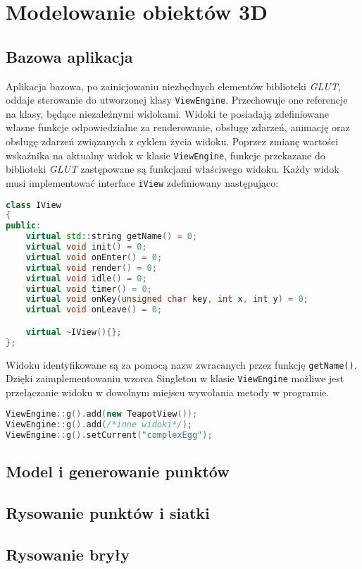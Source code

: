 \newpage
\section{Modelowanie obiektów 3D}
\subsection{Bazowa aplikacja}
Aplikacja bazowa, po zainicjowaniu niezbędnych elementów biblioteki \textit{GLUT}, oddaje sterowanie do utworzonej klasy \lstinline{ViewEngine}. Przechowuje one referencje na klasy, będące niezależnymi widokami. Widoki te posiadają zdefiniowane własne funkcje odpowiedzialne za renderowanie, obsługę zdarzeń, animację oraz obsługę zdarzeń związanych z cyklem życia widoku. Poprzez zmianę wartości wskaźnika na aktualny widok w klasie \lstinline{ViewEngine}, funkcje przekazane do biblioteki \textit{GLUT} zastępowane są funkcjami właściwego widoku. Każdy widok musi implementować interface \lstinline{iView} zdefiniowany następująco:

\begin{lstlisting}[language=C++, caption=Interface IView.]
class IView
{
public:
    virtual std::string getName() = 0;
    virtual void init() = 0;
    virtual void onEnter() = 0;
    virtual void render() = 0;
    virtual void idle() = 0;
    virtual void timer() = 0;
    virtual void onKey(unsigned char key, int x, int y) = 0;
    virtual void onLeave() = 0;

    virtual ~IView(){};
};
\end{lstlisting}
Widoku identyfikowane są za pomocą nazw zwracanych przez funkcję \lstinline{getName()}.
Dzięki zaimplementowaniu wzorca Singleton w klasie \lstinline{ViewEngine} możliwe jest przełączanie widoku w dowolnym miejscu wywołania metody w programie.
\begin{lstlisting}[language=C++, caption=Tworzeznie instancji widoków i ustawianie obecnego. Funkcja \lstinline{g} zwraca instancję klasy.]
ViewEngine::g().add(new TeapotView());
ViewEngine::g().add(/*inne widoki*/);
ViewEngine::g().setCurrent("complexEgg");
\end{lstlisting}
\subsection{Model i generowanie punktów}

\subsection{Rysowanie punktów i siatki}

\subsection{Rysowanie bryły}